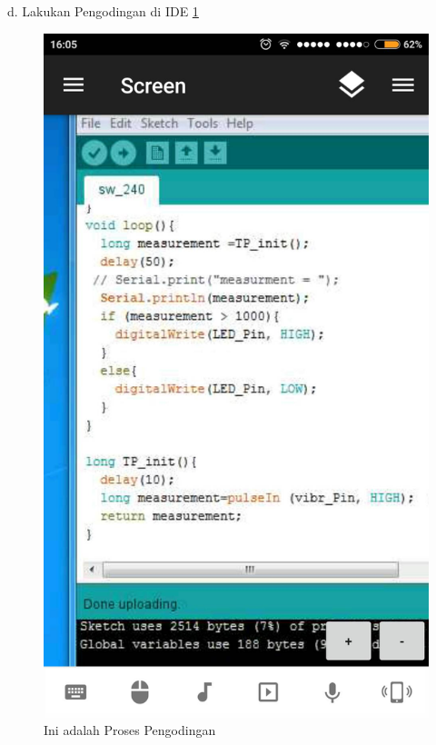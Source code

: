 \documentclass{article}
\begin{document}
 d. Lakukan Pengodingan di IDE 
  \ref{ar8}
  \begin{figure}[ht]
  \centerline{\includegraphics[width=1\textwidth]{../figures/ar8.jpg}}
  \caption{Ini adalah Proses Pengodingan}
  \label{ar8}
  \end{figure}

  
\end{document}
